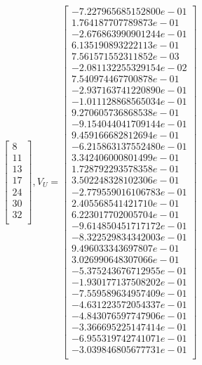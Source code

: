 \documentclass[12pt]{article}
\begin{document}
\begin{itemize}
$$\begin{bmatrix}
     8\\
    11\\
    13\\
    17\\
    24\\
    30\\
    32\\
\end{bmatrix}, V_U = \begin{bmatrix}
-7.227965685152800e-01\\
     1.764187707789873e-01\\
    -2.676863990901244e-01\\
     6.135190893222113e-01\\
     7.561571552311852e-03\\
    -2.081132255329154e-02\\
     7.540974467700878e-01\\
    -2.937163741220890e-01\\
    -1.011128868565034e-01\\
     9.270605736868538e-01\\
    -9.154044041709144e-01\\
     9.459166682812694e-01\\
    -6.215863137552480e-01\\
     3.342406000801499e-01\\
     1.728792293578358e-01\\
     3.502248328102306e-01\\
    -2.779559016106783e-01\\
     2.405568541421710e-01\\
     6.223017702005704e-01\\
    -9.614850451717172e-01\\
    -8.322529834342003e-01\\
     9.496033343697807e-01\\
     3.026990648307066e-01\\
    -5.375243676712955e-01\\
    -1.930177137508202e-01\\
    -7.559589634957409e-01\\
    -4.631223572054337e-01\\
    -4.843076597747906e-01\\
    -3.366695225147414e-01\\
    -6.955319742741071e-01\\
    -3.039846805677731e-01\\
\end{bmatrix}$$



\end{itemize}
\end{document}
